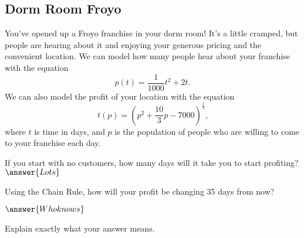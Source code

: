 \documentclass{ximera}
\begin{document}
\subsection{Dorm Room Froyo}
You've opened up a Froyo franchise in your dorm room! It's a little cramped, but people are hearing about it and enjoying your generous pricing and the convenient location. We can model how many people hear about your franchise with the equation $$p(t) = \frac{1}{1000}t^2 + 2t \text{.}$$ We can also model the profit of your location with the equation $$t(p) = (p^2 + \frac{10}{3}p - 7000)^{\frac{1}{4}} \text{,}$$ where $t$ is time in days, and $p$ is the population of people who are willing to come to your franchise each day.
\begin{question}
If you start with no customers, how many days will it take you to start profiting?
$\answer{Lots}$
\end{question}
\begin{question}
Using the Chain Rule, how will your profit be changing 35 days from now?

$\answer{Who knows}$

Explain exactly what your answer means.
\begin{freeResponse}
\end{freeResponse}
\end{question}
\end{document}
